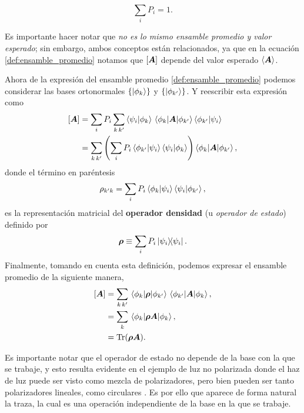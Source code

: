 \documentclass[../Main.tex]{subfiles}
\begin{document}
\begin{equation}
    \sum_i P_i = 1.
    \label{def:propiedad_normalizacion}
\end{equation}

Es importante hacer notar que \emph{no es lo mismo ensamble promedio y valor esperado}; sin embargo, ambos conceptos están relacionados, ya que en la ecuación \eqref{def:ensamble_promedio} notamos que $\qty[\bm{A}]$ depende del valor esperado $\expval{\bm{A}}$.

Ahora de la expresión del ensamble promedio \eqref{def:ensamble_promedio} podemos considerar las bases ortonormales $\{\ket{\phi_{k}}\}$ y $\{\ket{\phi_{k'}}\}$. Y reescribir esta expresión como
\begin{align}
    \qty[\bm{A}] &=
    \sum_i P_i \sum_{k\, k'}\ip{\psi_i}{\phi_{k}}\mel{\phi_{k}}{\bm{A}}{\phi_{k'}}\ip{\phi_{k'}}{\psi_i} \notag \\
    &= \sum_{k\,k'}\qty(\sum_iP_i\ip{\phi_{k'}}{\psi_i}\ip{\psi_i}{\phi_{k}})\mel{\phi_{k}}{\bm{A}}{\phi_{k'}},
\end{align}
donde el término en paréntesis
\begin{equation}
    \rho_{k'k}=\sum_iP_i\ip{\phi_{k}}{\psi_i}\ip{\psi_i}{\phi_{k'}},
    \label{def:elementos_matriz_rho}
\end{equation}
es la representación matricial del \textbf{operador densidad} (u \emph{operador de estado})
 definido por \begin{equation} 
    \bm{\rho}\equiv\sum_iP_i\op{\psi_i}.
    \label{def:operador_estado_pesos}
\end{equation}
Finalmente, tomando en cuenta esta definición, podemos expresar el ensamble promedio de la siguiente manera,
\begin{align}
    \qty[\bm{A}]&=
    \sum_{k\,k'}\mel{\phi_k}{\rhon}{\phi_{k'}}\mel{\phi_{k'}}{\bm{A}}{\phi_{k}}, \notag \\
    &=\sum_k \ev{\bm{\rho A}}{\phi_k}, \notag \\
    &= \Tr(\bm{\rho A}).
    \label{def:Operador_densidad}
\end{align}


Es importante notar que el operador de estado no depende de la base con la que se trabaje, y esto resulta evidente en el ejemplo de luz no polarizada donde el haz de luz puede ser visto como mezcla de polarizadores, pero bien pueden ser tanto polarizadores lineales, como circulares \cite{Fano}. Es por ello que aparece de forma natural la traza, la cual es una operación independiente de la base en la que se trabaje.
\end{document}

